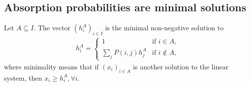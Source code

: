 \documentclass[a4paper]{article}
\begin{document}
\subsection{Absorption probabilities are minimal solutions}
\begin{theorem}
	Let $A \subseteq I$. The vector $(h_i^A)_{i \in I}$ is the minimal non-negative solution to
	\begin{align*}
		h_i^A = \begin{cases}
			1 &\mbox{if } i  \in A, \\
			\sum_{j} P(i, j) h_j^A &\mbox{if } i \not \in A,
		   \end{cases}
	\end{align*}
	where minimality means that if $(x_i)_{i \in A}$ is another solution to the linear system, then $x_i \ge h_i^A, \forall i$.
\end{theorem}
\end{document}
